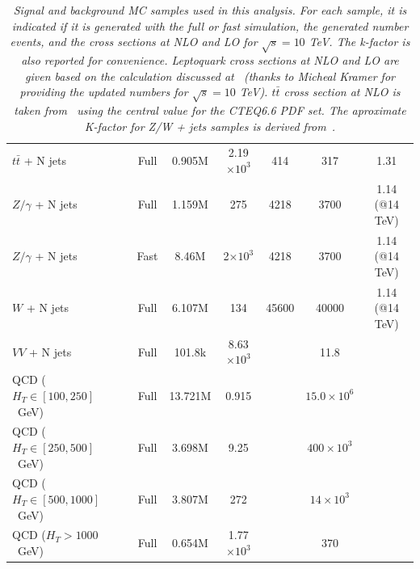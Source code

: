 \begin{table}[htb]
\begin{center}
\begin{tabular}{|l|cccccc|}
\hline
      $t\bar{t}$ + N jets         & Full      & 0.905M    &    2.19$\times 10^3$   & 414                 &  317                  & 1.31 \\
      $Z/\gamma$ + N jets         & Full      & 1.159M    &    275	           & 4218                &  3700                 & 1.14 (@14 TeV)\\
      $Z/\gamma$ + N jets         & Fast      & 8.46M     &    2$\times 10^3$      & 4218                &  3700                 & 1.14 (@14 TeV)\\
      $W$ + N jets                & Full      & 6.107M    &     134	           & 45600               &  40000                & 1.14 (@14 TeV)\\
      $VV$ + N jets               & Full      & 101.8k    &    8.63$\times 10^3$   &                     &  11.8                 & \\ \hline
      QCD ($H_T\in[100,250]$~GeV) & Full      & 13.721M   &    0.915	           &                     &  $15.0 \times 10^6$   & \\
      QCD ($H_T\in[250,500]$~GeV) & Full      & 3.698M    &    9.25	           &                     &  $400 \times 10^3$    & \\
      QCD ($H_T\in[500,1000]$~GeV)& Full      & 3.807M    &     272	           &                     &  $14 \times 10^3$     & \\
      QCD ($H_T>1000$~GeV)        & Full      & 0.654M    &    1.77$\times 10^3$   &                     &  $370$                & \\
\hline\hline
    \end{tabular}
    \caption{\small \sl Signal and background MC samples used in this analysis. For each sample, it is indicated 
      if it is generated with the full or fast simulation, the generated number events, 
      and the cross sections at NLO and LO for $\sqrt{s}=10$ TeV. 
      The k-factor is also reported for convenience. Leptoquark cross sections at NLO and LO
      are given based on the calculation discussed at~\cite{PhysRevD.71.057503} (thanks to Micheal Kramer 
      for providing the updated numbers for $\sqrt{s}=10$ TeV). $t\bar{t}$ cross section at NLO 
      is taken from~\cite{Cacciari:2008zb} using the central value for the CTEQ6.6 PDF set. 
      The aproximate K-factor for Z/W + jets samples is derived from~\cite{Frixione:2004us}.}
  \end{center}
\end{table}

